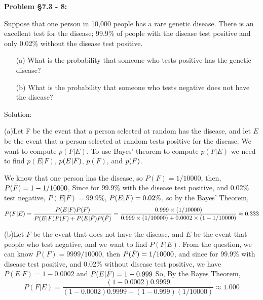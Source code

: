 \documentclass{article}
\newenvironment{problem}[1]
{\begin{mdframed}[default]
\textbf{Problem #1:}
}
{\end{mdframed}
}
\begin{document}
\begin{problem}{\S 7.3 - 8}
Suppose that one person in 10,000 people has a rare genetic disease. There is an
excellent test for the disease; 99.9\% of people with the disease test positive and
only 0.02\% without the disease test positive.
\begin{itemize}
\item[(a)] What is the probability that someone who tests positive has the
genetic disease?
\item[(b)] What is the probability that someone who tests negative does not
have the disease?
\end{itemize}

Solution:

(a)Let F be the event that a person selected at random has the disease, and let $E$ be
the event that a person selected at random tests positive for the disease. We want to compute
$p(F | E)$. To use Bayes' theorem to compute $p(F | E)$ we need to find $p(E | F)$, $p(E | \Bar{F})$, $p(F)$,
and $p(\Bar{F})$.

We know that one person has the disease, so $P(F)=1/10000$, then, $P(\Bar{F})=1-1/10000$, Since for 99.9\% with the disease test positive, and 0.02\% test negative,
$P(E|F)=99.9\%$, $P(E|\Bar{F})=0.02\%$, so by the Bayes' Theorem, \[P(F|E)=\frac{P(E|F)P(F)}{P(E|F)P(F)+P(E|\Bar{F})P(\Bar{F})}=\frac{0.999\times(1/10000)}{0.999\times(1/10000)+0.0002\times(1-1/10000)}\approx 0.333\]

(b)Let $F$ be the event that does not have the disease, and $E$ be the event that people who test negative, and we want to find $P(F|E)$.
From the question, we can know $P(F)=9999/10000$, then $P(\Bar{F})=1/10000$, and since for 99.9\% with disease test positive, and 0.02\% without disease test positive,
we have $P(E|F)=1-0.0002$ and $P(E|\Bar{F})=1-0.999$
So, By the Bayes Theorem, \[P(F|E)=\frac{(1-0.0002)0.9999}{(1-0.0002)0.9999+(1-0.999)(1/10000)}\approx 1.000\]

\end{problem}
\end{document}

